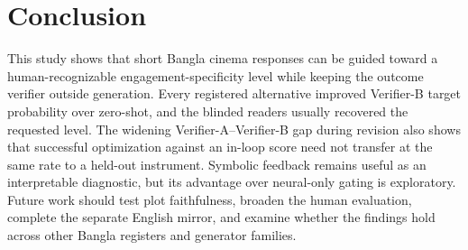 \section{Conclusion}
\label{sec:conclusion}

This study shows that short Bangla cinema responses can be guided toward a human-recognizable engagement-specificity level while keeping the outcome verifier outside generation. Every registered alternative improved Verifier-B target probability over zero-shot, and the blinded readers usually recovered the requested level. The widening Verifier-A--Verifier-B gap during revision also shows that successful optimization against an in-loop score need not transfer at the same rate to a held-out instrument. Symbolic feedback remains useful as an interpretable diagnostic, but its advantage over neural-only gating is exploratory. Future work should test plot faithfulness, broaden the human evaluation, complete the separate English mirror, and examine whether the findings hold across other Bangla registers and generator families.
